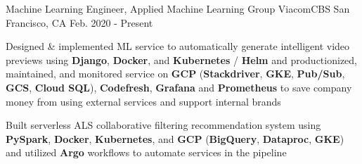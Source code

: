 \begin{cventries}
\cventry
    {Machine Learning Engineer, Applied Machine Learning Group} %
    {ViacomCBS} %
    {San Francisco, CA} %
    {Feb. 2020 - Present} %
    {
      \begin{cvitems} %
 		\item {Designed \& implemented ML service to automatically generate intelligent video previews using \textbf{Django}, \textbf{Docker}, and \textbf{Kubernetes} / \textbf{Helm} and productionized, maintained, and monitored service on \textbf{GCP} (\textbf{Stackdriver}, \textbf{GKE}, \textbf{Pub/Sub}, \textbf{GCS}, \textbf{Cloud SQL}), \textbf{Codefresh}, \textbf{Grafana} and \textbf{Prometheus} to save company money from using external services and support internal brands}
  		\item {Built serverless ALS collaborative filtering recommendation system using \textbf{PySpark}, \textbf{Docker}, \textbf{Kubernetes}, and \textbf{GCP} (\textbf{BigQuery}, \textbf{Dataproc}, \textbf{GKE}) and utilized \textbf{Argo} workflows to automate services in the pipeline}
      \end{cvitems}
    }





\end{cventries}
